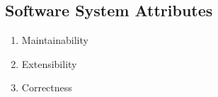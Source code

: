 \subsection{Software System Attributes}
\begin{enumerate}[label*=\arabic*]
		\item Maintainability
		\item Extensibility
		\item Correctness
\end{enumerate}





      

      
